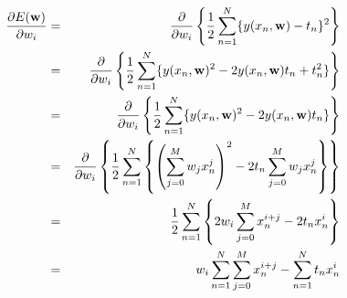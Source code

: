 \begin{eqnarray}
  \frac{\partial E({\bf w})}{\partial w_i}
  \nonumber &=&\frac{\partial}{\partial w_i}\left\{ \frac{1}{2}\sum_{n=1}^{N}\{{y(x_{n},{\bf w})-t_{n}}\}^{2}\right\} \\
  \nonumber &=&\frac{\partial}{\partial w_i}\left\{ \frac{1}{2}\sum_{n=1}^{N}\{{y(x_{n},{\bf w})^2-2y(x_{n},{\bf w})t_{n}+t_{n}^2}\}\right\} \\
  \nonumber &=&\frac{\partial}{\partial w_i}\left\{ \frac{1}{2}\sum_{n=1}^{N}\{{y(x_{n},{\bf w})^2-2y(x_{n},{\bf w})t_{n}}\}\right\} \\
  \nonumber &=&\frac{\partial}{\partial w_i}\left\{
    \frac{1}{2}\sum_{n=1}^{N}\left\{{\left( \sum_{j=0}^{M}w_j x_n^j \right)^2-2t_{n}\sum_{j=0}^{M}w_j x_n^j}\right\}
  \right\} \\
  \nonumber &=& \frac{1}{2}\sum_{n=1}^{N}\left\{2w_i \sum_{j=0}^{M}x_n^{i+j} - 2t_{n}x_n^i\right\} \\
  \nonumber &=& {w_i\sum_{n=1}^{N}\sum_{j=0}^{M}x_n^{i+j} - \sum_{n=1}^{N}t_{n}x_n^i}
\end{eqnarray}
